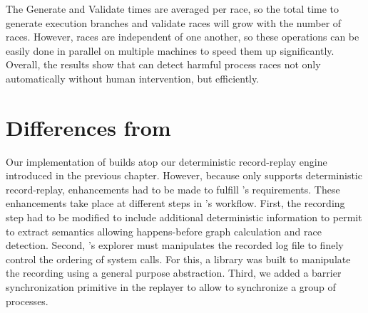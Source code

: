 The Generate and Validate times are averaged per race, so the total
time to generate execution branches and validate races will grow with
the number of races.  However, races are independent of one another,
so these operations can be easily done in parallel on multiple
machines to speed them up significantly.  Overall, the results show
that \racepro can detect harmful process races not only automatically
without human intervention, but efficiently.

\section{Differences from \scribe} \label{racepro:sec:scribe}

Our implementation of \racepro builds atop our deterministic \scribe
record-replay engine introduced in the previous chapter.  However, because
\scribe only supports deterministic record-replay, enhancements had to be made to
fulfill \racepro's requirements. These enhancements take place at
different steps in \racepro's workflow. First, the recording step had to be
modified to include additional deterministic information to permit \racepro
to extract semantics allowing happens-before graph calculation and race detection.
Second, \racepro's explorer must manipulates the recorded log file to finely control
the ordering of system calls. For this, a library was built to manipulate the
recording using a general purpose abstraction. Third, we added a barrier
synchronization primitive in the replayer to allow \racepro to synchronize
a group of processes.

